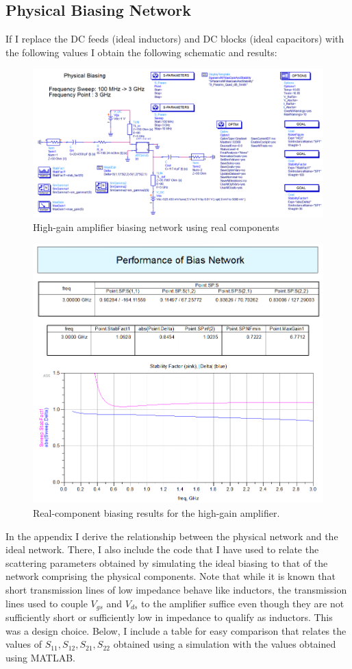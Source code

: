 \subsection{Physical Biasing Network}
If I replace the DC feeds (ideal inductors) and DC blocks (ideal capacitors)
with the following values I obtain the following schematic and results:

\begin{figure}[H]
    \centering
    \includegraphics[width=0.8\linewidth]{Images/A2P1PhysicalSchematic.png}
    \caption{High-gain amplifier biasing network using real components}
    \label{fig:A2P1PhysicalSchematic}
\end{figure}

\begin{figure}[H]
    \centering
    \includegraphics[width=0.8\linewidth]{Images/A2P1PhysicalBiasingResults.png}
    \caption{Real-component biasing results for the high-gain amplifier.}
    \label{fig:A2P1PhysicalBiasingResults}
\end{figure}

In the appendix I derive the relationship between the physical network and the
ideal network. There, I also include the code that I have used to relate the scattering
parameters obtained by simulating the ideal biasing to that of the network
comprising the physical components. Note that while it is known that short
transmission lines of low impedance behave like inductors, the transmission
lines used to couple $V_{gs}$ and $V_{ds}$ to the amplifier suffice even though
they are not sufficiently short or sufficiently low in impedance to qualify as
inductors. This was a design choice. Below, I include a table for easy
comparison that relates the values of $S_{11}, S_{12}, S_{21}, S_{22}$ obtained
using a simulation with the values obtained using MATLAB.


